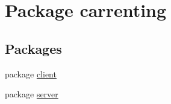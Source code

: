 \hypertarget{namespacecarrenting}{}\section{Package carrenting}
\label{namespacecarrenting}
\subsection*{Packages}
\begin{DoxyCompactItemize}
\item 
package \mbox{\hyperlink{namespacecarrenting_1_1client}{client}}
\item 
package \mbox{\hyperlink{namespacecarrenting_1_1server}{server}}
\end{DoxyCompactItemize}
